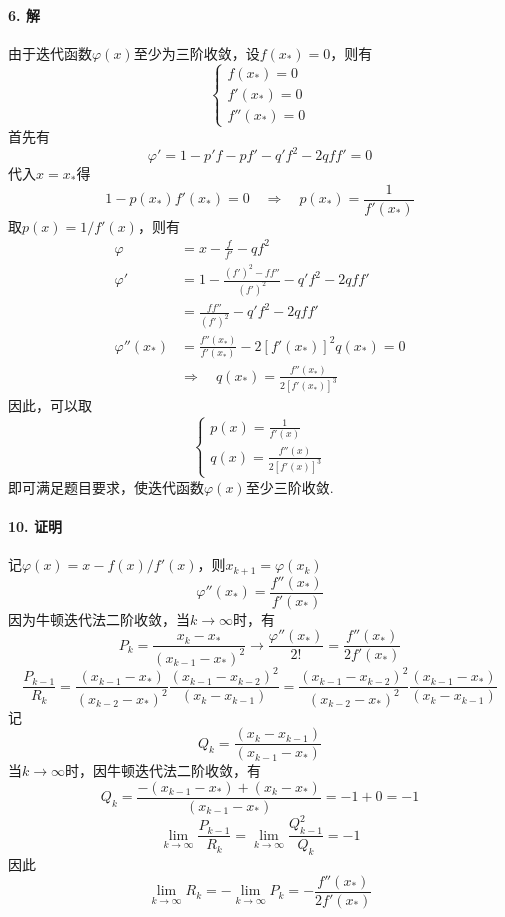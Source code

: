 \paragraph{6. 解}

由于迭代函数$\varphi(x)$至少为三阶收敛，设$f(x_*) = 0$，则有
\[\begin{cases}
f(x_*) = 0 \\
f'(x_*) = 0 \\
f''(x_*) = 0
\end{cases}\]
首先有
\[\varphi' = 1 - p'f - pf' - q'f^2 - 2qff' = 0\]
代入$x = x_*$得
\[1 - p(x_*)f'(x_*) = 0 \quad \Rightarrow \quad p(x_*) = \frac{1}{f'(x_*)}\]
取$p(x) = 1 / f'(x)$，则有
\[\begin{split}
\varphi & = x - \frac{f}{f'} - qf^2 \\
\varphi' & = 1 - \frac{(f')^2 - ff''}{(f')^2} - q'f^2 - 2qff' \\
& = \frac{ff''}{(f')^2} - q'f^2 - 2qff'\\
\varphi''(x_*) &= \frac{f''(x_*)}{f'(x_*)} - 2[f'(x_*)]^2q(x_*) = 0 \\
& \Rightarrow \quad q(x_*) = \frac{f''(x_*)}{2[f'(x_*)]^3}
\end{split}\]
因此，可以取
\[\begin{cases}
p(x) = \frac{1}{f'(x)} \\
q(x) = \frac{f''(x)}{2[f'(x)]^3}
\end{cases}\]
即可满足题目要求，使迭代函数$\varphi(x)$至少三阶收敛.

\paragraph{10. 证明}

记$\varphi(x) = x - f(x) / f'(x)$，则$x_{k + 1} = \varphi(x_k)$
\[\varphi''(x_*) = \frac{f''(x_*)}{f'(x_*)}\]
因为牛顿迭代法二阶收敛，当$k \to \infty$时，有
\[P_k = \frac{x_{k} - x_*}{(x_{k - 1} - x_*)^2} \to \frac{\varphi''(x_*)}{2!} = \frac{f''(x_*)}{2f'(x_*)}\]
\[\frac{P_{k - 1}}{R_k} = \frac{(x_{k - 1} - x_*)}{(x_{k - 2} - x_*)^2}\frac{(x_{k - 1} - x_{k - 2})^2}{(x_k - x_{k - 1})} = \frac{(x_{k - 1} - x_{k - 2})^2}{(x_{k - 2} - x_*)^2}\frac{(x_{k - 1} - x_*)}{(x_k - x_{k - 1})}\]
记
\[Q_k = \frac{(x_k - x_{k - 1})}{(x_{k - 1} - x_*)}\]
当$k \to \infty$时，因牛顿迭代法二阶收敛，有
\[Q_k = \frac{-(x_{k - 1} - x_*) + (x_k - x_*)}{(x_{k - 1} - x_*)} = -1 + 0 = -1\]
\[\lim_{k \to \infty} \frac{P_{k - 1}}{R_k} = \lim_{k \to \infty} \frac{Q_{k - 1}^2}{Q_{k}} = -1\]
因此
\[\lim_{k \to \infty} R_{k} = -\lim_{k \to \infty} P_{k} = -\frac{f''(x_*)}{2f'(x_*)}\]

